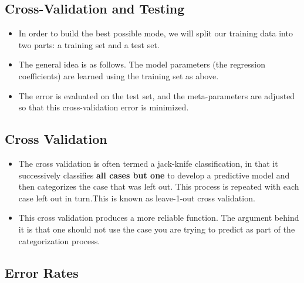 \documentclass[]{report}
\begin{document}
\subsection{Cross-Validation and Testing}
\begin{itemize}
	\item In order to build the best possible mode, we will split our training data into two parts: a training set and a test set. 
	
	\item 	The general idea is as follows. The model parameters (the regression coefficients) are learned using the training set as above. 
	\item The error is evaluated on the test set, and the meta-parameters are adjusted so that this cross-validation error is minimized. 

\end{itemize}	
\subsection{Cross Validation}
\begin{itemize}	
%	
	\item The cross validation is often termed a jack-knife classification, in that
	it successively classifies \textbf{all cases but one} to develop a predictive model and then
	categorizes the case that was left out. This process is repeated with each case left out in
	turn.This is known as leave-1-out cross validation. 
	
	\item 	This cross validation produces a more reliable function. The argument behind it is that
	one should not use the case you are trying to predict as part of the categorization process.
\end{itemize}



\subsection{Error Rates}
\end{document}
